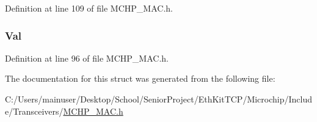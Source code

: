 Definition at line 109 of file M\+C\+H\+P\+\_\+\+M\+A\+C.\+h.

\hypertarget{struct_m_a_c___t_r_a_n_s___p_a_r_a_m_a5ab8c2bf45b20b5f7aa3a4f083896cec}{}
\subsubsection[{Val}]{ Val}\label{struct_m_a_c___t_r_a_n_s___p_a_r_a_m_a5ab8c2bf45b20b5f7aa3a4f083896cec}


Definition at line 96 of file M\+C\+H\+P\+\_\+\+M\+A\+C.\+h.



The documentation for this struct was generated from the following file\+:\begin{DoxyCompactItemize}
\item 
C\+:/\+Users/mainuser/\+Desktop/\+School/\+Senior\+Project/\+Eth\+Kit\+T\+C\+P/\+Microchip/\+Include/\+Transceivers/\hyperlink{_m_c_h_p___m_a_c_8h}{M\+C\+H\+P\+\_\+\+M\+A\+C.\+h}\end{DoxyCompactItemize}
